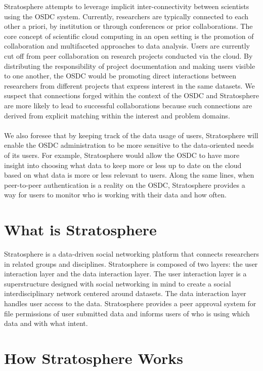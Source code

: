\begin{multicols*}{2}
Stratosphere attempts to leverage implicit inter-connectivity between
scientists using the OSDC system. Currently, researchers are typically
connected to each other a priori, by institution or through
conferences or prior collaborations. The core concept of scientific
cloud computing in an open setting is the promotion of collaboration
and multifaceted approaches to data analysis. Users are currently cut
off from peer collaboration on research projects conducted via the
cloud. By distributing the responsibility of project documentation and
making users visible to one another, the OSDC would be promoting
direct interactions between researchers from different projects that
express interest in the same datasets. We suspect that connections
forged within the context of the OSDC and Stratosphere are more likely to lead to
successful collaborations because such connections are derived from
explicit matching within the interest and problem domains.
\\
\\
We also foresee that by keeping track of the data usage of users,
Stratosphere will enable the OSDC administration to be more sensitive to the
data-oriented needs of its users. For example, Stratosphere would allow the
OSDC to have more insight into choosing what data to keep more or less
up to date on the cloud based on what data is more or less relevant to users.
Along the same lines, when peer-to-peer authentication is a reality on
the OSDC, Stratosphere provides a way for users to monitor who is
working with their data and how often. 

\section{What is Stratosphere}
\label{sec:what}

Stratosphere is a data-driven social networking platform that connects
researchers in related groups and disciplines. Stratosphere is
composed of two layers: the user interaction layer and the data
interaction layer. The user interaction layer is a superstructure
designed with social networking in mind to create a social
interdisciplinary network centered around datasets. The data
interaction layer handles user access to the data. Stratosphere
provides a peer approval system for file permissions of user submitted
data and informs users of who is using which data and with what
intent.

\section{How Stratosphere Works}
\label{sec:how}


\end{multicols*}
